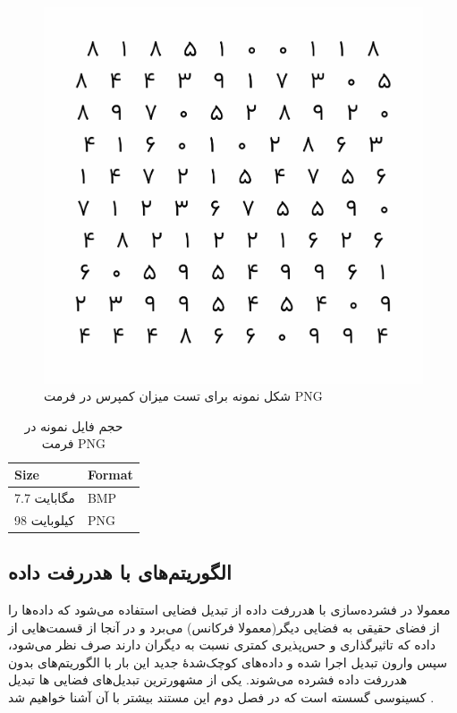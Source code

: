 \begin{figure}
	\centering
	\includegraphics[scale=0.6]{figs/compressed.png}
	\caption[شکل نمونه برای تست میزان کمپرس در فرمت PNG ]{شکل نمونه برای تست میزان کمپرس در فرمت PNG \cite{my_picture}}
	\label{example_1}
\end{figure}

\begin{table}
	\centering
	\caption{حجم فایل نمونه در فرمت PNG }
	\label{compare_1}
	\begin{tabular}{@{}ll@{}}
	\toprule
	Size & Format \\ \midrule
	7.7 مگابایت & BMP \\
	98 کیلوبایت & PNG \\ \bottomrule
	\end{tabular}
	\end{table}



\subsection{الگوریتم‌های با هدررفت داده}

معمولا در فشرده‌سازی با هدررفت داده از تبدیل‌‌ فضایی 
استفاده می‌شود که داده‌ها را از فضای حقیقی به فضایی دیگر(معمولا فرکانس) می‌برد و در آنجا از قسمت‌هایی از داده که تاثیرگذاری و حس‌پذیری کمتری
نسبت به دیگران دارند صرف نظر می‌شود، سپس وارون تبدیل اجرا شده و داده‌های کوچک‌شدهٔ جدید این بار با الگوریتم‌های 
بدون هدررفت داده فشرده می‌شوند. یکی از 
مشهورترین
تبدیل‌های فضایی
ها تبدیل کسینوسی گسسته
است که در فصل‌ دوم این مستند بیشتر با آن آشنا خواهیم شد
\cite{dct}.
